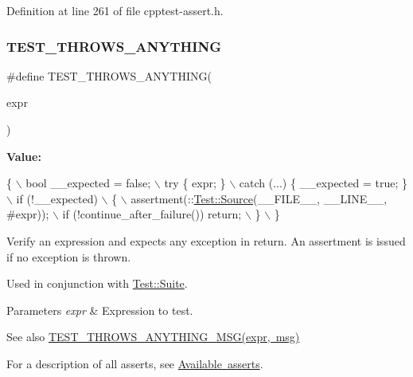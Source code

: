 Definition at line 261 of file cpptest-\/assert.\+h.

\mbox{\label{cpptest-assert_8h_a895af88056cd626a010136ac07b81d37}} 
\subsubsection{\texorpdfstring{T\+E\+S\+T\+\_\+\+T\+H\+R\+O\+W\+S\+\_\+\+A\+N\+Y\+T\+H\+I\+NG}{TEST\_THROWS\_ANYTHING}}
{\footnotesize\ttfamily \#define T\+E\+S\+T\+\_\+\+T\+H\+R\+O\+W\+S\+\_\+\+A\+N\+Y\+T\+H\+I\+NG(\begin{DoxyParamCaption}\item[{}]{expr }\end{DoxyParamCaption})}

{\bfseries Value\+:}
\begin{DoxyCode}
\{                                                               \(\backslash\)
        bool \_\_expected = \textcolor{keyword}{false};                                    \(\backslash\)
        try \{ expr; \}                                               \(\backslash\)
        catch (...) \{ \_\_expected = \textcolor{keyword}{true}; \}                          \(\backslash\)
        if (!\_\_expected)                                            \(\backslash\)
        \{                                                           \(\backslash\)
            assertment(::\mbox{\hyperlink{class_test_1_1_source}{Test::Source}}(\_\_FILE\_\_, \_\_LINE\_\_, #expr));  \(\backslash\)
            if (!continue\_after\_failure()) return;                  \(\backslash\)
        \}                                                           \(\backslash\)
    \}
\end{DoxyCode}
Verify an expression and expects any exception in return. An assertment is issued if no exception is thrown.

Used in conjunction with \mbox{\hyperlink{class_test_1_1_suite}{Test\+::\+Suite}}.


\begin{DoxyParams}{Parameters}
{\em expr} & Expression to test.\\
\hline
\end{DoxyParams}
\begin{DoxySeeAlso}{See also}
\mbox{\hyperlink{cpptest-assert_8h_a052597a8fd7dbc40ba350c735c4517c5}{T\+E\+S\+T\+\_\+\+T\+H\+R\+O\+W\+S\+\_\+\+A\+N\+Y\+T\+H\+I\+N\+G\+\_\+\+M\+S\+G(expr, msg)}}
\end{DoxySeeAlso}
For a description of all asserts, see \mbox{\hyperlink{asserts}{Available asserts}}. 

